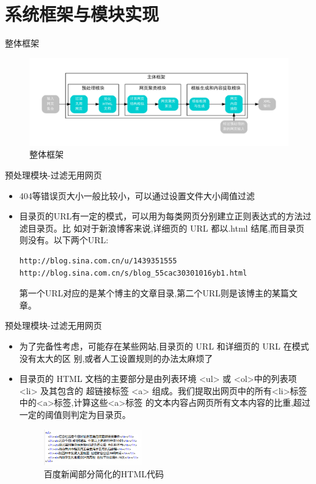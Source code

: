 \documentclass[presentation]{beamer}
\begin{document}
\section{系统框架与模块实现}
\label{sec-2}
\begin{frame}[label=sec-2-1]{整体框架}
\begin{figure}[htb]
\centering
\includegraphics[width=\textwidth]{./framework.pdf}
\caption{\label{fig:framework}整体框架}
\end{figure}
\end{frame}

\begin{frame}[fragile,label=sec-2-2]{预处理模块-过滤无用网页}
 \begin{itemize}
\item 404等错误页大小一般比较小，可以通过设置文件大小阈值过滤
\item 目录页的URL有一定的模式，可以用为每类网页分别建立正则表达式的方法过滤目录页。比
如对于新浪博客来说,详细页的 URL 都以.html 结尾,而目录页则没有。以下两个URL:
\scriptsize
\begin{verbatim}
http://blog.sina.com.cn/u/1439351555
http://blog.sina.com.cn/s/blog_55cac30301016yb1.html
\end{verbatim}
\normalsize
第一个URL对应的是某个博主的文章目录,第二个URL则是该博主的某篇文章。
\end{itemize}
\end{frame}

\begin{frame}[label=sec-2-3]{预处理模块-过滤无用网页}
\begin{itemize}
\item 为了完备性考虑，可能存在某些网站,目录页的 URL 和详细页的 URL 在模式没有太大的区
别,或者人工设置规则的办法太麻烦了
\item 目录页的 HTML 文档的主要部分是由列表环境 <ul> 或 <ol>中的列表项 <li> 及其包含的
超链接标签 <a> 组成。我们提取出网页中的所有<li>标签中的<a>标签,计算这些<a>标签
的文本内容占网页所有文本内容的比重,超过一定的阈值则判定为目录页。
\begin{figure}[htb]
\centering
\includegraphics[width=0.4\textwidth]{./baidunews.png}
\caption{\label{fig:baidunews}百度新闻部分简化的HTML代码}
\end{figure}
\end{itemize}
\end{frame}
\end{document}
